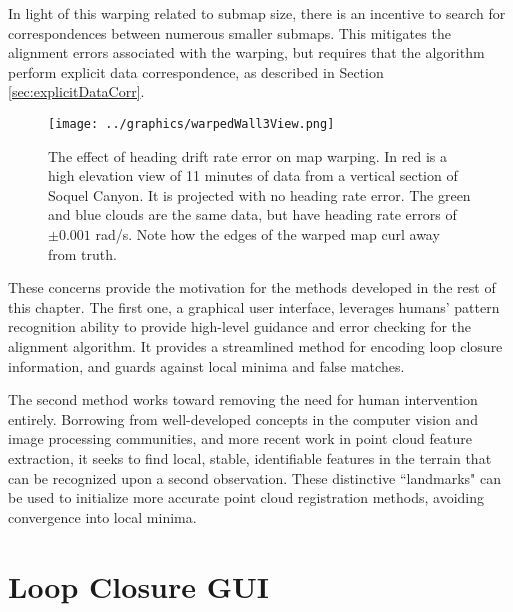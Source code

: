 In light of this warping related to submap size, there is an incentive to search for correspondences between numerous smaller submaps. This mitigates the alignment errors associated with the warping, but requires that the algorithm perform explicit data correspondence, as described in Section \ref{sec:explicitDataCorr}.

 \begin{figure}[htb]
   \centering
   \texttt{[image: ../graphics/warpedWall3View.png]} %
   \caption{The effect of heading drift rate error on map warping. In red is a high elevation view of 11 minutes of data from a vertical section of Soquel Canyon. It is projected with no heading rate error. The green and blue clouds are the same data, but have heading rate errors of $\pm0.001$ rad/s. Note how the edges of the warped map curl away from truth.}
   \label{fig:motionErrorWarping}
\end{figure}


These concerns provide the motivation for the methods developed in the rest of this chapter. The first one, a graphical user interface, leverages humans' pattern recognition ability to provide high-level guidance and error checking for the alignment algorithm. It provides a streamlined method for encoding loop closure information, and guards against local minima and false matches. 

The second method works toward removing the need for human intervention entirely. Borrowing from well-developed concepts in the computer vision and image processing communities, and more recent work in point cloud feature extraction, it seeks to find local, stable, identifiable features in the terrain that can be recognized upon a second observation. These distinctive ``landmarks" can be used to initialize more accurate point cloud registration methods, avoiding convergence into local minima. 


\section{Loop Closure GUI}
\label{sec:GUI}

